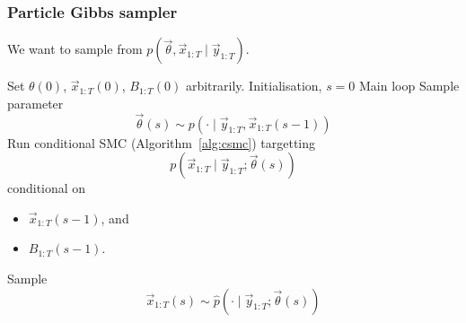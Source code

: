 \subsubsection{Particle Gibbs sampler}
We want to sample from $p(\vec \theta, \vec x_{1:T} \mid \vec y_{1:T})$.
    \begin{algorithmbis}\label{alg:sampling/pmcmc-pg-pg/pg}
        \begin{algorithmic}[1]
            \State Set $\theta(0)$, $\vec x_{1:T}(0)$, $B_{1:T}(0)$ arbitrarily. \Comment Initialisation, $s = 0$
             \Comment Main loop
                \State Sample parameter
                    $$\vec \theta(s) \sim p\left(\cdot \mid \vec y_{1:T}, \vec x_{1:T}(s - 1)\right)$$
                \State Run conditional SMC (Algorithm~\ref{alg:csmc}) targetting
                    $$p(\vec x_{1:T} \mid \vec y_{1:T}; \vec \theta(s))$$
                    conditional on
                    \begin{itemize}
                        \item $\vec x_{1:T}(s - 1)$, and
                        \item $B_{1:T}(s - 1)$.
                    \end{itemize}
                \State Sample
                    $$\vec x_{1:T}(s) \sim \hat p(\cdot \mid \vec y_{1:T}; \vec \theta(s))$$
            \EndFor
        \end{algorithmic}
    \end{algorithmbis}
